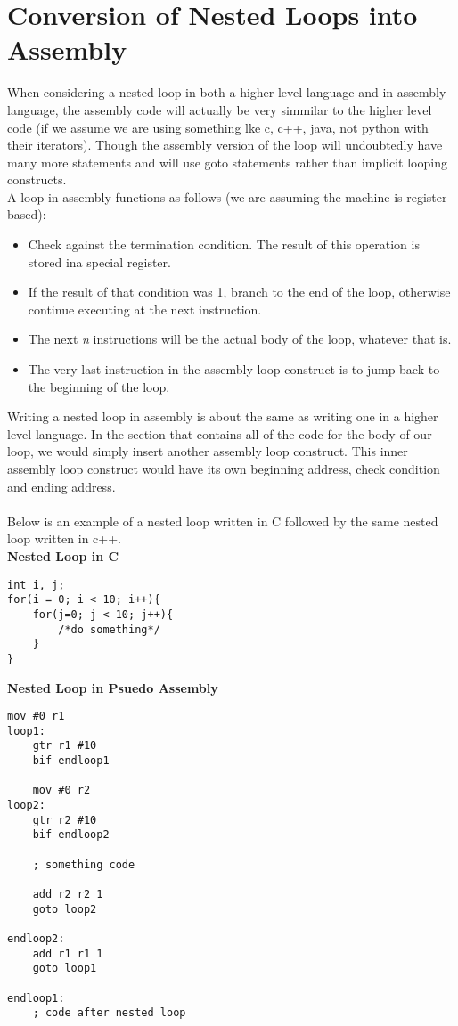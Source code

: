 \documentclass[11pt]{article}
\begin{document}
\newpage
\section{Conversion of Nested Loops into Assembly}
When considering a nested loop in both a higher level language and in assembly
language, 
the assembly code will actually be very simmilar to the higher level code (if we
assume we are using something lke c, c++, java, not python with their
iterators).
Though the assembly version of the loop will undoubtedly have many more
statements and will use goto statements rather than implicit looping
constructs.\\

A loop in assembly functions as follows (we are assuming the machine is
register based):
\begin{itemize}
    \item Check against the termination condition.  The result of this
        operation is stored ina special register.
    \item If the result of that condition was 1, branch to the end of the loop,
        otherwise continue executing at the next instruction.
    \item The next \textit{n} instructions will be the actual body of the loop,
        whatever that is.
    \item The very last instruction in the assembly loop construct is to jump
        back to the beginning of the loop.
\end{itemize}



Writing a nested loop in assembly is about the same as writing one in a higher
level language.  In the section that contains all of the code for the body of
our loop, we would simply insert another assembly loop construct.  This inner
assembly loop construct would have its own beginning address, check condition
and ending address.\\\\

\newpage
Below is an example of a nested loop written in C followed by the same nested
loop written in c++.\\

\textbf{Nested Loop in C}
\begin{lstlisting}[style=MyC]
int i, j;
for(i = 0; i < 10; i++){
    for(j=0; j < 10; j++){
        /*do something*/
    }
}
\end{lstlisting}

\textbf{Nested Loop in Psuedo Assembly}
\begin{lstlisting}[style=MyAsm]
    mov #0 r1
loop1:
    gtr r1 #10
    bif endloop1

    mov #0 r2
loop2:
    gtr r2 #10
    bif endloop2

    ; something code

    add r2 r2 1
    goto loop2

endloop2:
    add r1 r1 1
    goto loop1

endloop1:
    ; code after nested loop
\end{lstlisting}
\end{document}
